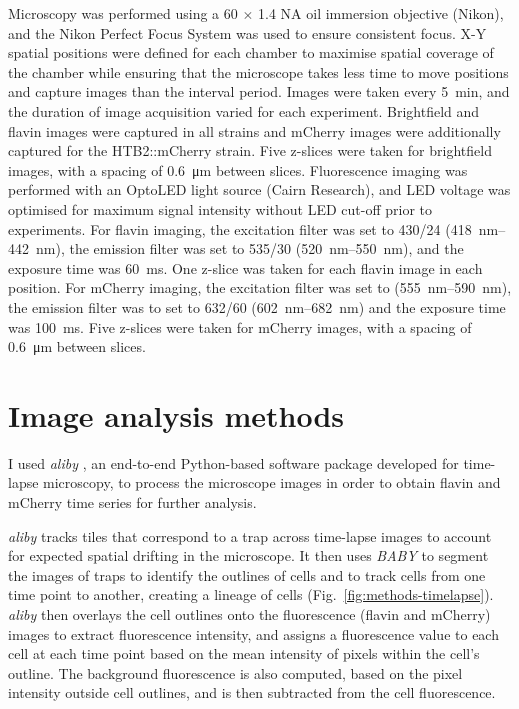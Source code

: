 Microscopy was performed using a 60 $\times$ 1.4 NA oil immersion objective (Nikon), and the Nikon Perfect Focus System was used to ensure consistent focus.
X-Y spatial positions were defined for each chamber to maximise spatial coverage of the chamber while ensuring that the microscope takes less time to move positions and capture images than the interval period.
Images were taken every \SI{5}{\minute}, and the duration of image acquisition varied for each experiment.
Brightfield and flavin images were captured in all strains and mCherry images were additionally captured for the HTB2::mCherry strain.
Five z-slices were taken for brightfield images, with a spacing of \SI{0.6}{\micro\metre} between slices.
Fluorescence imaging was performed with an OptoLED light source (Cairn Research), and LED voltage was optimised for maximum signal intensity without LED cut-off prior to experiments.
For flavin imaging, the excitation filter was set to 430/24 (\SIrange{418}{442}{\nano\metre}), the emission filter was set to 535/30 (\SIrange{520}{550}{\nano\metre}), and the exposure time was \SI{60}{\milli\second}.
One z-slice was taken for each flavin image in each position.
For mCherry imaging, the excitation filter was set to (\SIrange{555}{590}{\nano\metre}), the emission filter was to set to 632/60 (\SIrange{602}{682}{\nano\metre}) and the exposure time was \SI{100}{\milli\second}.
Five z-slices were taken for mCherry images, with a spacing of \SI{0.6}{\micro\metre} between slices.

\section{Image analysis methods}
\label{sec:methods-segmentation}

I used \textit{aliby} \parencite{munozgonzalezPhenotypingSingleCells2023}, an end-to-end Python-based software package developed for time-lapse microscopy, to process the microscope images in order to obtain flavin and mCherry time series for further analysis.

\textit{aliby} tracks tiles that correspond to a trap across time-lapse images to account for expected spatial drifting in the microscope.
It then uses \textit{BABY} \parencite{pietschDeterminingGrowthRates2023} to segment the images of traps to identify the outlines of cells and to track cells from one time point to another, creating a lineage of cells (Fig.\ \ref{fig:methods-timelapse}).
\textit{aliby} then overlays the cell outlines onto the fluorescence (flavin and mCherry) images to extract fluorescence intensity, and assigns a fluorescence value to each cell at each time point based on the mean intensity of pixels within the cell's outline.
The background fluorescence is also computed, based on the pixel intensity outside cell outlines, and is then subtracted from the cell fluorescence.

